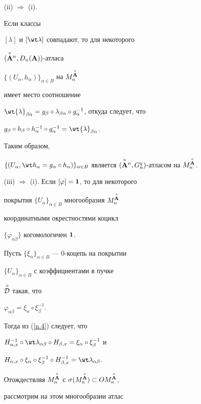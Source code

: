 \begin{pf}


(ii) $\Rightarrow$ (i).


Если классы


$[\lambda]$ и $[\wt\lambda]$ совпадают, то для некоторого


$(\overset{\circ}{\bold A}{}^n,D_n({\bold A}))$-атласа


$\{(U_\alpha,h_\alpha)\}_{\alpha \in B}$ на $M^{\overset{\circ}{\bold A}{}}_n$


имеет место соотношение


$\wt{\lambda}_{\beta\alpha}=g_{\beta}\circ\lambda_{\beta


\alpha}\circ g_{\alpha}^{-1}$, откуда следует, что


$g_\beta\circ h_\beta\circ h_{\alpha}^{-1}\circ


g_{\alpha}^{-1}=\wt {\lambda}_{\beta\alpha}$.


Таким образом,


$\{(U_\alpha,\wt h_{\alpha}=g_{\alpha}\circ h_{\alpha})\}_{\alpha


\in B}$ является  $(\Aon,G_n^q)$-атласом на $M^{\Ao}_n$.





(iii) $\Rightarrow$ (i). Если $[\varphi]={\bold 1}$, то для некоторого


покрытия $\{U_\alpha\}_{\alpha \in B}$ многообразия $M^{\overset{\circ}{\bold A}{}}_n$


координатными окрестностями коцикл


$\{\varphi_{\alpha\beta}\}$ когомологичен ${\bold 1}$.


Пусть $\{\xi_{\alpha}\}_{\alpha \in B}$ --- $0$-коцепь на покрытии


$\{U_\alpha\}_{\alpha \in B}$ с коэффициентами в пучке


$\overset{\,\circ}{\cal D}{}$ такая, что


$\varphi_{\alpha\beta}=\xi_{\alpha}\circ \xi_{\beta}^{-1}$.


Тогда из (\ref{n.4}) следует, что


$H_{\alpha,x}^{-1} \circ\wt\lambda_{\alpha\beta}


\circ H_{\beta,x}=\xi_{\alpha}\circ \xi_{\beta}^{-1}$ и


$H_{\alpha,x}\circ \xi_{\alpha}\circ \xi_{\beta}^{-1}\circ


H_{\beta,x}^{-1}=\wt\lambda_{\alpha\beta}$.


Отождествляя $M^{\overset{\circ}{\bold A}{}}_n$ с $\sigma (M^{\overset{\circ}{\bold A}{}}_n)\subset OM^{\overset{\circ}{\bold A}{}}_n$,


рассмотрим на этом многообразии атлас



\end{pf}
